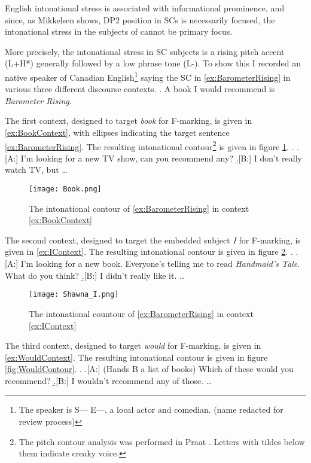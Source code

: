 \documentclass[
	letterpaper,
]{article}
\begin{document}
English intonational stress is associated with informational prominence, and since, as Mikkelsen shows, DP2 position in SCs is necessarily focused, the intonational stress in the subjects of \Last cannot be primary focus.

More precisely, the intonational stress in SC subjects is a rising pitch accent (L+H*) generally followed by a low phrase tone (L-).
To show this I recorded an native speaker of Canadian English\footnote{
	The speaker is  S--- E---, a local actor and comedian. (name redacted for review process)
} saying the SC in \ref{ex:BarometerRising} in various three different discourse contexts.
\ex. \label{ex:BarometerRising} A book I would recommend is \textit{Barometer Rising}.

The first context, designed to target \textit{book} for F-marking, is given in \ref{ex:BookContext}, with ellipses indicating the target sentence \ref{ex:BarometerRising}.
The resulting intonational contour\footnote{
	The pitch contour analysis was performed in Praat \parencite{praat}.
	Letters with tildes below them indicate creaky voice.
} is given in figure \ref{fig:BookContour}.
\ex.\label{ex:BookContext}
\a.[A:] I'm looking for a new TV show, can you recommend any?
\b.[B:] I don't really watch TV, but \dots

\begin{figure}[h]
	\centering
	\texttt{[image: Book.png]}
	\caption{The intonational contour of \ref{ex:BarometerRising} in context \ref{ex:BookContext}}
	\label{fig:BookContour}
\end{figure}
\FloatBarrier
The second context, designed to target the embedded subject \textit{I} for F-marking, is given in \ref{ex:IContext}.
The resulting intonational contour is given in figure \ref{fig:IContour}.
\ex.\label{ex:IContext}
\a.[A:] I'm looking for a new book. Everyone's telling me to read \textit{Handmaid's Tale}. What do you think?
\b.[B:] I didn't really like it. \dots

\begin{figure}[h]
	\centering
	\texttt{[image: Shawna\_I.png]}
	\caption{The intonational countour of \ref{ex:BarometerRising} in context \ref{ex:IContext}}
	\label{fig:IContour}
\end{figure}
\FloatBarrier
The third context, designed to target \textit{would} for F-marking, is given in \ref{ex:WouldContext}.
The resulting intonational contour is given in figure \ref{fig:WouldContour}.
\ex.\label{ex:WouldContext}
\a.[A:] (Hands B a list of books) Which of these would you recommend?
\b.[B:] I wouldn't recommend any of those. \dots
\end{document}
